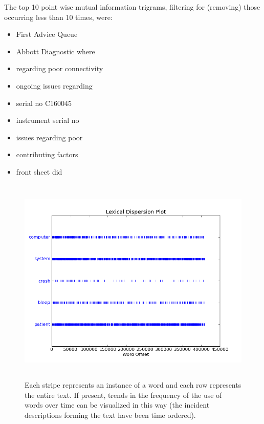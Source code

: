 The top 10 \gls{point wise mutual information} trigrams, filtering for (removing) those occurring less than 10 times, were: 

\begin{itemize}
 \item First Advice Queue
 \item Abbott Diagnostic where
 \item regarding poor connectivity
 \item ongoing issues regarding
 \item serial no C160045
 \item instrument serial no
 \item issues regarding poor
 \item contributing factors
 \item front sheet did
\end{itemize}

\begin{figure}[htp]
\centering
\includegraphics[width=15cm,height=10cm]{figs/lexicaldispersionplot.png}
\caption{Each stripe represents an instance of a word and each row represents the entire text. If present, trends in the frequency of the use of words over time can be visualized in this way (the incident descriptions forming the text have been time ordered).}\label{fig:lexicaldispersionplot}
\end{figure}


